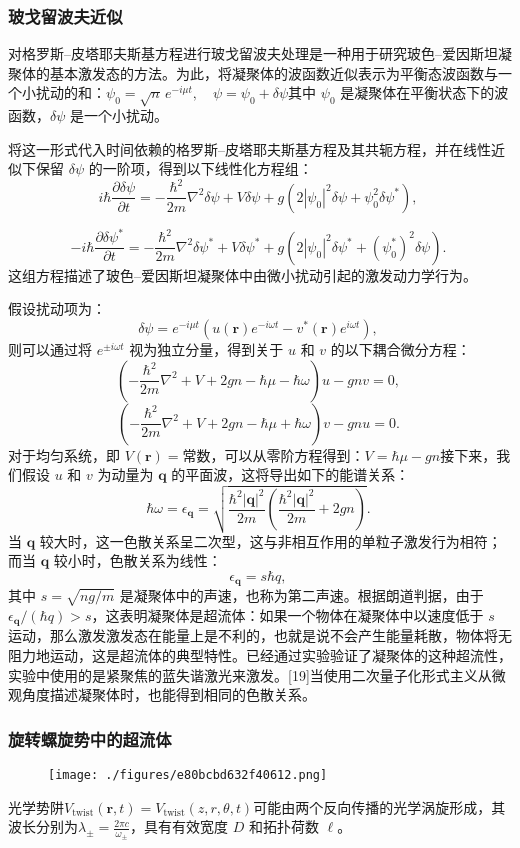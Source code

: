 \subsubsection{玻戈留波夫近似}
对格罗斯–皮塔耶夫斯基方程进行玻戈留波夫处理是一种用于研究玻色–爱因斯坦凝聚体的基本激发态的方法。为此，将凝聚体的波函数近似表示为平衡态波函数与一个小扰动的和：$\psi_0 = \sqrt{n} \, e^{-i\mu t}, \quad \psi = \psi_0 + \delta \psi$其中 $\psi_0$ 是凝聚体在平衡状态下的波函数，$\delta \psi$ 是一个小扰动。

将这一形式代入时间依赖的格罗斯–皮塔耶夫斯基方程及其共轭方程，并在线性近似下保留 $\delta \psi$ 的一阶项，得到以下线性化方程组：
$$
i\hbar \frac{\partial \delta \psi}{\partial t} = -\frac{\hbar^2}{2m} \nabla^2 \delta \psi + V \delta \psi + g \left( 2|\psi_0|^2 \delta \psi + \psi_0^2 \delta \psi^* \right),~
$$

$$
- i\hbar \frac{\partial \delta \psi^*}{\partial t} = -\frac{\hbar^2}{2m} \nabla^2 \delta \psi^* + V \delta \psi^* + g \left( 2|\psi_0|^2 \delta \psi^* + (\psi_0^*)^2 \delta \psi \right).~
$$
这组方程描述了玻色–爱因斯坦凝聚体中由微小扰动引起的激发动力学行为。

假设扰动项为：
$$
\delta \psi = e^{-i\mu t} \left( u(\mathbf{r}) e^{-i\omega t} - v^*(\mathbf{r}) e^{i\omega t} \right),~
$$
则可以通过将 $e^{\pm i\omega t}$ 视为独立分量，得到关于 $u$ 和 $v$ 的以下耦合微分方程：
$$
\left( -\frac{\hbar^2}{2m} \nabla^2 + V + 2gn - \hbar \mu - \hbar \omega \right) u - gn v = 0,~
$$
$$
\left( -\frac{\hbar^2}{2m} \nabla^2 + V + 2gn - \hbar \mu + \hbar \omega \right) v - gn u = 0.~
$$
对于均匀系统，即 $V(\mathbf{r}) = \text{常数}$，可以从零阶方程得到：$V = \hbar \mu - gn$接下来，我们假设 $u$ 和 $v$ 为动量为 $\mathbf{q}$ 的平面波，这将导出如下的能谱关系：
$$
\hbar \omega = \epsilon_{\mathbf{q}} = \sqrt{ \frac{\hbar^2 |\mathbf{q}|^2}{2m} \left( \frac{\hbar^2 |\mathbf{q}|^2}{2m} + 2gn \right) }.~
$$
当 $\mathbf{q}$ 较大时，这一色散关系呈二次型，这与非相互作用的单粒子激发行为相符；而当 $\mathbf{q}$ 较小时，色散关系为线性：
$$
\epsilon_{\mathbf{q}} = s \hbar q,~
$$
其中 $s = \sqrt{ng/m}$ 是凝聚体中的声速，也称为第二声速。根据朗道判据，由于 $\epsilon_{\mathbf{q}} / (\hbar q) > s$，这表明凝聚体是超流体：如果一个物体在凝聚体中以速度低于 $s$ 运动，那么激发激发态在能量上是不利的，也就是说不会产生能量耗散，物体将无阻力地运动，这是超流体的典型特性。已经通过实验验证了凝聚体的这种超流性，实验中使用的是紧聚焦的蓝失谐激光来激发。[19]当使用二次量子化形式主义从微观角度描述凝聚体时，也能得到相同的色散关系。
\subsubsection{旋转螺旋势中的超流体}
\begin{figure}[ht]
\centering
\texttt{[image: ./figures/e80bcbd632f40612.png]}
\caption{} \label{fig_GLS_1}
\end{figure}
光学势阱$V_{\text{twist}}(\mathbf{r}, t) = V_{\text{twist}}(z, r, \theta, t)$可能由两个反向传播的光学涡旋形成，其波长分别为$\lambda_{\pm} = \frac{2\pi c}{\omega_{\pm}}$，具有有效宽度 $D$ 和拓扑荷数 $\ell$。

